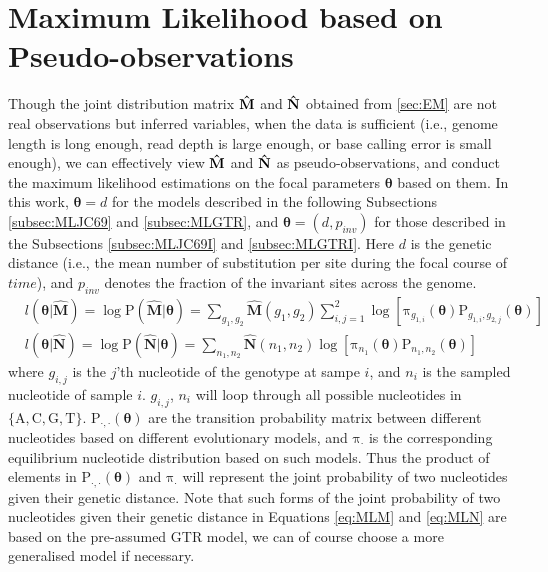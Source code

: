 \documentclass{article}
\begin{document}
\section{Maximum Likelihood based on Pseudo-observations} \label{sec:ML}
Though the joint distribution matrix ${\bf \hat{M}}$ and ${\bf \hat{N}}$ obtained from \ref{sec:EM} are not real observations but inferred variables, when the data is sufficient (i.e., genome length is long enough, read depth is large enough, or base calling error is small enough), we can effectively view ${\bf \hat{M}}$ and ${\bf \hat{N}}$ as pseudo-observations, and conduct the maximum likelihood estimations on the focal parameters $\bm{\theta}$ based on them. In this work, $\bm{\theta}=d$ for the models described in the following Subsections \ref{subsec:MLJC69} and \ref{subsec:MLGTR}, and $\bm{\theta}=(d,p_{inv})$ for those described in the Subsections \ref{subsec:MLJC69I} and \ref{subsec:MLGTRI}. Here $d$ is the genetic distance (i.e., the mean number of substitution per site during the focal course of $time$), and $p_{inv}$ denotes the fraction of the invariant sites across the genome.
\begin{align}
&l(\bm{\theta}|\mathbf{\hat{M}})=\log\mathrm{P}(\mathbf{\hat{M}}|\bm{\theta})=\sum_{g_1,g_2}\mathbf{\hat{M}}(g_1,g_2)\sum_{i,j=1}^{2}\log\left[\mathrm{\pi}_{g_{1,i}}(\bm{\theta})\mathrm{P}_{g_{1,i},g_{2,j}}(\bm{\theta})\right] \label{eq:MLM}\\
&l(\bm{\theta}|\mathbf{\hat{N}})=\log\mathrm{P}(\mathbf{\hat{N}}|\bm{\theta})=\sum_{n_1,n_2}\mathbf{\hat{N}}(n_1,n_2)\log\left[\mathrm{\pi}_{n_1}(\bm{\theta})\mathrm{P}_{n_1,n_2}(\bm{\theta})\right] \label{eq:MLN}
\end{align}
where $g_{i,j}$ is the $j$'th nucleotide of the genotype at sampe $i$, and $n_i$ is the sampled nucleotide of sample $i$. $g_{i,j}$, $n_i$ will loop through all possible nucleotides in $\{\mathrm{A,C,G,T}\}$. $\mathrm{P}_{\cdot,\cdot}(\bm{\theta})$ are the transition probability matrix between different nucleotides based on different evolutionary models, and $\mathrm{\pi}_{\cdot}$ is the corresponding equilibrium nucleotide distribution based on such models. Thus the product of elements in $\mathrm{P}_{\cdot,\cdot}(\bm{\theta})$ and $\mathrm{\pi}_{\cdot}$ will represent the joint probability of two nucleotides given their genetic distance. Note that such forms of the joint probability of two nucleotides given their genetic distance in Equations \ref{eq:MLM} and \ref{eq:MLN} are based on the pre-assumed GTR model, we can of course choose a more generalised model if necessary.
\end{document}
